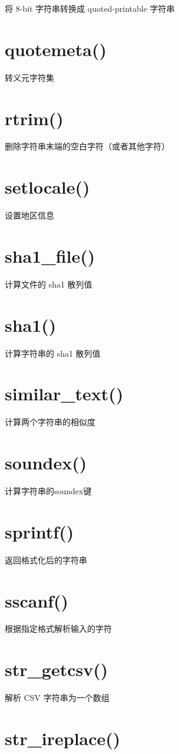 将 8-bit 字符串转换成 quoted-printable 字符串
\section{quotemeta()}
转义元字符集

\section{rtrim()}

删除字符串末端的空白字符（或者其他字符）
\section{setlocale()}

设置地区信息
\section{sha1\_file()}

计算文件的 sha1 散列值
\section{sha1()}

计算字符串的 sha1 散列值
\section{similar\_text()}

计算两个字符串的相似度
\section{soundex()}

计算字符串的soundex键
\section{sprintf()}

返回格式化后的字符串

\section{sscanf()}

根据指定格式解析输入的字符
\section{str\_getcsv()}

解析 CSV 字符串为一个数组
\section{str\_ireplace()}

